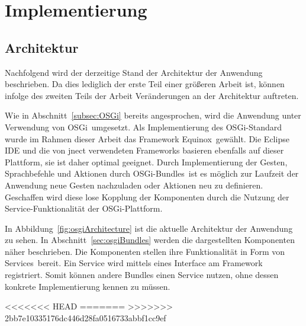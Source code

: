\chapter{Implementierung}
\label{chap:Implementierung}

\section{Architektur}

Nachfolgend wird der derzeitige Stand der Architektur der Anwendung beschrieben. Da dies lediglich der erste Teil einer gr\"oßeren Arbeit ist, 
k\"onnen infolge des zweiten Teils der Arbeit Ver\"anderungen an der Architektur auftreten. 

Wie in Abschnitt~\ref{subsec:OSGi} bereits angesprochen, wird die Anwendung unter Verwendung von OSGi~\footnotemark[1] umgesetzt. 
Als Implementierung des OSGi-Standard wurde im Rahmen dieser Arbeit das Framework \gls{Equinox}~\footnotemark[2] gew\"ahlt. 
Die Eclipse IDE und die von jnect verwendeten Frameworks basieren ebenfalls auf dieser Plattform, sie ist daher optimal geeignet. 
Durch Implementierung der Gesten, Sprachbefehle und Aktionen durch OSGi-Bundles~\footnotemark[3] ist es m\"oglich zur Laufzeit 
der Anwendung neue Gesten nachzuladen oder Aktionen neu zu definieren. Geschaffen wird diese lose Kopplung der Komponenten durch 
die Nutzung der Service-Funktionalit\"at der OSGi-Plattform.

In Abbildung~\ref{fig:osgiArchitecture} ist die aktuelle Architektur der Anwendung zu sehen. In Abschnitt~\ref{sec:osgiBundles} werden 
die dargestellten Komponenten n\"aher beschrieben. Die Komponenten stellen ihre Funktionalit\"at in Form von Services~\footnotemark[3] bereit. 
Ein Service wird mittels eines Interface am Framework registriert. Somit k\"onnen andere Bundles einen Service nutzen, ohne dessen konkrete 
Implementierung kennen zu m\"ussen.

<<<<<<< HEAD
=======
>>>>>>> 2bb7e10335176dc446d28fa0516733abbf1cc9ef

